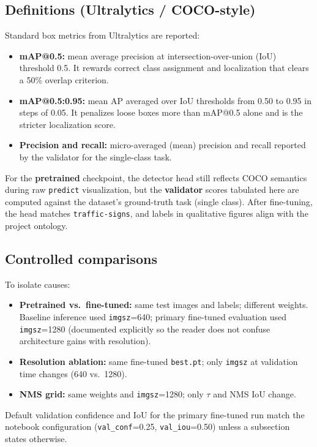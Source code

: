 \documentclass[11pt,a4paper]{article}
\begin{document}
\subsection{Definitions (Ultralytics / COCO-style)}
Standard box metrics from Ultralytics are reported:
\begin{itemize}[leftmargin=*]
  \item \textbf{mAP@0.5:} mean average precision at intersection-over-union (IoU) threshold \num{0.5}. It rewards correct class assignment and localization that clears a \num{50}\% overlap criterion.
  \item \textbf{mAP@0.5:0.95:} mean AP averaged over IoU thresholds from \num{0.50} to \num{0.95} in steps of \num{0.05}. It penalizes loose boxes more than mAP@0.5 alone and is the stricter localization score.
  \item \textbf{Precision and recall:} micro-averaged (mean) precision and recall reported by the validator for the single-class task.
\end{itemize}

For the \textbf{pretrained} checkpoint, the detector head still reflects COCO semantics during raw \texttt{predict} visualization, but the \textbf{validator} scores tabulated here are computed against the dataset's ground-truth task (single class). After fine-tuning, the head matches \texttt{traffic-signs}, and labels in qualitative figures align with the project ontology.

\subsection{Controlled comparisons}
To isolate causes:
\begin{itemize}[leftmargin=*]
  \item \textbf{Pretrained vs.\ fine-tuned:} same test images and labels; different weights. Baseline inference used \texttt{imgsz}=\num{640}; primary fine-tuned evaluation used \texttt{imgsz}=\num{1280} (documented explicitly so the reader does not confuse architecture gains with resolution).
  \item \textbf{Resolution ablation:} same fine-tuned \texttt{best.pt}; only \texttt{imgsz} at validation time changes (\num{640} vs.\ \num{1280}).
  \item \textbf{NMS grid:} same weights and \texttt{imgsz}=\num{1280}; only $\tau$ and NMS IoU change.
\end{itemize}

Default validation confidence and IoU for the primary fine-tuned run match the notebook configuration (\texttt{val\_conf}=\num{0.25}, \texttt{val\_iou}=\num{0.50}) unless a subsection states otherwise.
\end{document}
